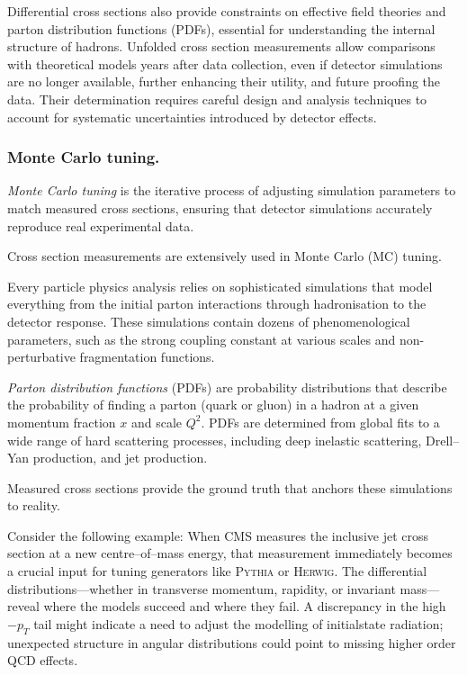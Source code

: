 \begin{definition}
            Differential cross sections also provide constraints on effective field theories and parton distribution functions (PDFs), essential for understanding the internal structure of hadrons.
            Unfolded cross section measurements allow comparisons with theoretical models years after data collection, even if detector simulations are no longer available, further enhancing their utility, and future proofing the data.
            Their determination requires careful design and analysis techniques to account for systematic uncertainties introduced by detector effects.

        \subsubsection{Monte Carlo tuning.}
            \begin{definition}
                \emph{Monte Carlo tuning} is the iterative process of adjusting simulation parameters to match measured cross sections, ensuring that detector simulations accurately reproduce real experimental data.
            \end{definition}
            Cross section measurements are extensively used in Monte Carlo (MC) tuning.
            
            Every particle physics analysis relies on sophisticated simulations that model everything from the initial parton interactions through hadronisation to the detector response.
            These simulations contain dozens of phenomenological parameters, such as the strong coupling constant at various scales and non-perturbative fragmentation functions.
            \begin{definition}
                \emph{Parton distribution functions} (PDFs) are probability distributions that describe the probability of finding a parton (quark or gluon) in a hadron at a given momentum fraction \(x\) and scale \(Q^2\).
                PDFs are determined from global fits to a wide range of hard scattering processes, including deep inelastic scattering, Drell--Yan production, and jet production.
            \end{definition}
            Measured cross sections provide the ground truth that anchors these simulations to reality.

            Consider the following example:
            When CMS measures the inclusive jet cross section at a new centre--of--mass energy, that measurement immediately becomes a crucial input for tuning generators like \textsc{Pythia} or \textsc{Herwig}.
            The differential distributions---whether in transverse momentum, rapidity, or invariant mass---reveal where the models succeed and where they fail.
            A discrepancy in the high\(-p_T\) tail might indicate a need to adjust the modelling of initialstate radiation; unexpected structure in angular distributions could point to missing higher order QCD effects.

\end{definition}
